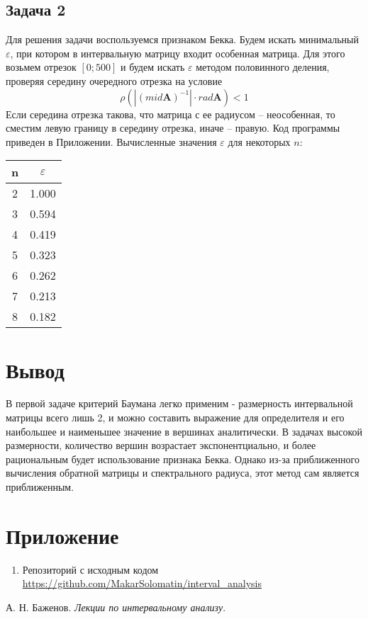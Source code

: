 \documentclass[14pt,a4paper,article]{ncc}
\begin{document}
\subsection{Задача 2}
Для решения задачи воспользуемся признаком Бекка. Будем искать минимальный $\varepsilon$, при котором 
в интервальную матрицу входит особенная матрица. Для этого возьмем отрезок $[0; 500]$ и будем
искать $\varepsilon$ методом половинного деления, проверяя середину очередного отрезка на условие
$$ \rho(|(mid \textbf{A})^{-1}| \cdot rad \textbf{A}) < 1 $$
Если середина отрезка такова, что матрица с ее радиусом -- неособенная, то сместим левую границу в середину отрезка,
иначе -- правую. Код программы приведен в Приложении.
Вычисленные значения $\varepsilon$ для некоторых $n$:

\begin{center}
\begin{tabular}{|c|c|}
\hline
n & $\varepsilon$ \\
\hline
2 & 1.000\\
3 & 0.594\\
4 & 0.419\\
5 & 0.323\\
6 & 0.262\\
7 & 0.213\\
8 & 0.182\\
\hline
\end{tabular}
\end{center}
\section{Вывод}
В первой задаче критерий Баумана легко применим - размерность интервальной матрицы всего лишь 2,
и можно составить выражение для определителя и его наибольшее и наименьшее значение в вершинах аналитически.
В задачах высокой размерности, количество вершин возрастает экспонентциально, и более рациональным будет 
использование признака Бекка.
Однако из-за приближенного вычисления обратной матрицы и спектрального радиуса, 
этот метод сам является приближенным.

\section{Приложение}
\begin{enumerate}
    \item Репозиторий с исходным кодом \\ \url{https://github.com/MakarSolomatin/interval_analysis}
\end{enumerate}

\begin{thebibliography}{9}
     А. Н. Баженов. \textit{Лекции по интервальному анализу}.
\end{thebibliography}
\end{document}
